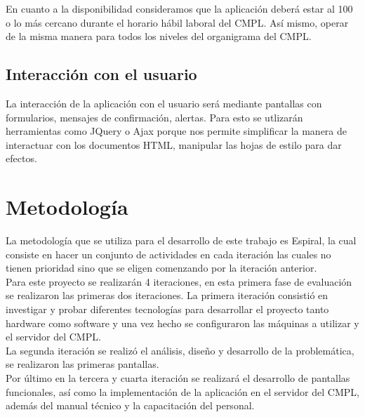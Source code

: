 En cuanto a la disponibilidad consideramos que la aplicación deberá estar al 100 o lo más cercano durante el horario hábil laboral del CMPL. Así mismo, operar de la misma manera para todos los niveles del organigrama del CMPL.\\

\subsection{Interacción con el usuario}

La interacción de la aplicación con el usuario será mediante pantallas con formularios, mensajes de confirmación, alertas. Para esto se utlizarán herramientas como JQuery o Ajax porque nos permite simplificar la manera de interactuar con los documentos HTML, manipular las hojas de estilo para dar efectos.

\section{Metodología}

La metodología que se utiliza para el desarrollo de este trabajo es Espiral, la cual consiste en hacer un conjunto de actividades en cada iteración las cuales no tienen prioridad sino que se eligen comenzando por la iteración anterior.\\

Para este proyecto se realizarán 4 iteraciones, en esta primera fase de evaluación se realizaron las primeras dos iteraciones. La primera iteración consistió en investigar y probar  diferentes tecnologías para desarrollar el proyecto tanto hardware como software y una vez hecho se configuraron las máquinas a utilizar y el servidor del CMPL. \\
La segunda iteración se realizó el análisis, diseño y desarrollo de la problemática, se realizaron las primeras pantallas.\\

Por último en la tercera y cuarta iteración se realizará el desarrollo de pantallas funcionales, así como la implementación de la aplicación en el servidor del CMPL, además del manual técnico y la capacitación del personal. \\ 

